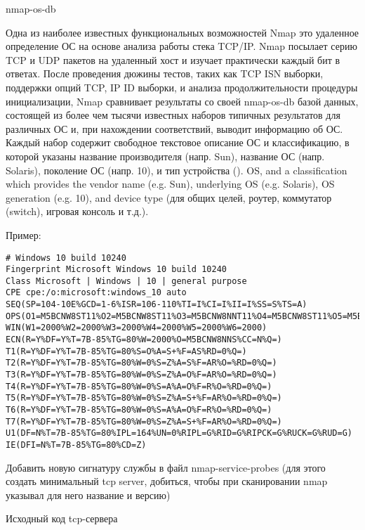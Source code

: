 \documentclass[12pt,a4paper]{report}
\begin{document}
nmap-os-db

Одна из наиболее известных функциональных возможностей Nmap это удаленное определение ОС на основе анализа работы стека TCP/IP. Nmap посылает серию TCP и UDP пакетов на удаленный хост и изучает практически каждый бит в ответах. После проведения дюжины тестов, таких как TCP ISN выборки, поддержки опций TCP, IP ID выборки, и анализа продолжительности процедуры инициализации, Nmap сравнивает результаты со своей nmap-os-db базой данных, состоящей из более чем тысячи известных наборов типичных результатов для различных ОС и, при нахождении соответствий, выводит информацию об ОС. Каждый набор содержит свободное текстовое описание ОС и классификацию, в которой указаны название производителя (напр. Sun), название ОС (напр. Solaris), поколение ОС (напр. 10), и тип устройства (). OS, and a classification which provides the vendor name (e.g. Sun), underlying OS (e.g. Solaris), OS generation (e.g. 10), and device type (для общих целей, роутер, коммутатор (switch), игровая консоль и т.д.).

Пример:
\begin{verbatim}
# Windows 10 build 10240
Fingerprint Microsoft Windows 10 build 10240
Class Microsoft | Windows | 10 | general purpose
CPE cpe:/o:microsoft:windows_10 auto
SEQ(SP=104-10E%GCD=1-6%ISR=106-110%TI=I%CI=I%II=I%SS=S%TS=A)
OPS(O1=M5BCNW8ST11%O2=M5BCNW8ST11%O3=M5BCNW8NNT11%O4=M5BCNW8ST11%O5=M5BCNW8ST11%O6=M5BCST11)
WIN(W1=2000%W2=2000%W3=2000%W4=2000%W5=2000%W6=2000)
ECN(R=Y%DF=Y%T=7B-85%TG=80%W=2000%O=M5BCNW8NNS%CC=N%Q=)
T1(R=Y%DF=Y%T=7B-85%TG=80%S=O%A=S+%F=AS%RD=0%Q=)
T2(R=Y%DF=Y%T=7B-85%TG=80%W=0%S=Z%A=S%F=AR%O=%RD=0%Q=)
T3(R=Y%DF=Y%T=7B-85%TG=80%W=0%S=Z%A=O%F=AR%O=%RD=0%Q=)
T4(R=Y%DF=Y%T=7B-85%TG=80%W=0%S=A%A=O%F=R%O=%RD=0%Q=)
T5(R=Y%DF=Y%T=7B-85%TG=80%W=0%S=Z%A=S+%F=AR%O=%RD=0%Q=)
T6(R=Y%DF=Y%T=7B-85%TG=80%W=0%S=A%A=O%F=R%O=%RD=0%Q=)
T7(R=Y%DF=Y%T=7B-85%TG=80%W=0%S=Z%A=S+%F=AR%O=%RD=0%Q=)
U1(DF=N%T=7B-85%TG=80%IPL=164%UN=0%RIPL=G%RID=G%RIPCK=G%RUCK=G%RUD=G)
IE(DFI=N%T=7B-85%TG=80%CD=Z)
\end{verbatim}


Добавить новую сигнатуру службы в файл nmap-service-probes
(для этого создать минимальный tcp server, добиться, чтобы при
сканировании nmap указывал для него название и версию)

Исходный код tcp-сервера
\end{document}
